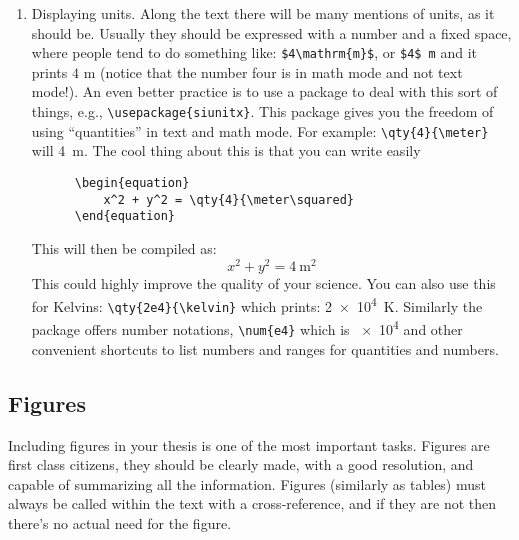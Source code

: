 \begin{enumerate}
  \item Displaying units. Along the text there will be many mentions of units, as it should be. Usually they should be expressed with a number and a fixed space, where people tend to do something like: \verb|$4\mathrm{m}$|, or \verb|$4$ m| and it prints $4$ m (notice that the number four is in math mode and not text mode!). An even better practice is to use a package to deal with this sort of things, e.g., \verb|\usepackage{siunitx}|. This package gives you the freedom of using ``quantities'' in text and math mode. For example: \verb|\qty{4}{\meter}| will \qty{4}{\m}. The cool thing about this is that you can write easily
  \begin{verbatim}
      \begin{equation}
          x^2 + y^2 = \qty{4}{\meter\squared}
      \end{equation}
  \end{verbatim}

  This will then be compiled as:
  \begin{equation}
    x^2 + y^2 = \qty{4}{\meter\squared}
  \end{equation}
  This could highly improve the quality of your science. You can also use this for Kelvins: \verb|\qty{2e4}{\kelvin}| which prints: \qty{2e4}{\kelvin}. Similarly the package offers number notations, \verb|\num{e4}| which is \num{e4} and other convenient shortcuts to list numbers and ranges for quantities and numbers. 



  
  
\end{enumerate}


\subsection{Figures}

Including figures in your thesis is one of the most important tasks. Figures are first class citizens, they should be clearly made, with a good resolution, and capable of summarizing all the information. Figures (similarly as tables) must always be called within the text with a cross-reference, and if they are not then there's no actual need for the figure.

